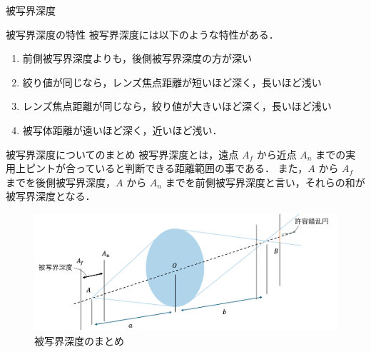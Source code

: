 \documentclass[8pt, jfont=ipaexm, t]{beamer} %
\begin{document}
\begin{frame}[allowframebreaks]{被写界深度}
    \newpage

    \begin{block}{被写界深度の特性}
      被写界深度には以下のような特性がある．
      \begin{enumerate}
        \item 前側被写界深度よりも，後側被写界深度の方が深い
        \item 絞り値が同じなら，レンズ焦点距離が短いほど深く，長いほど浅い
        \item レンズ焦点距離が同じなら，絞り値が大きいほど深く，長いほど浅い
        \item 被写体距離が遠いほど深く，近いほど浅い．
      \end{enumerate}
    \end{block}

    \newpage
    \begin{block}{被写界深度についてのまとめ}
      被写界深度とは，遠点 $A_f$ から近点 $A_n$ までの実用上ピントが合っていると判断できる距離範囲の事である．
      また，$A$ から $A_f$ までを後側被写界深度，$A$ から $A_n$ までを前側被写界深度と言い，それらの和が被写界深度となる．
    \end{block}
    \begin{figure}[H]
      \centering
      \includegraphics[scale=0.35]{figure/09.png}
      \caption{被写界深度のまとめ}
      \label{fig:09}
    \end{figure}

\end{frame}
\end{document}
